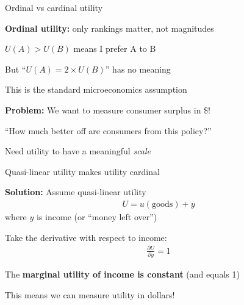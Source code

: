\documentclass[notes,11pt, aspectratio=169]{beamer}
\newenvironment{wideitemize}{\itemize\addtolength{\itemsep}{10pt}}{\enditemize}
\begin{document}
\begin{frame}{Ordinal vs cardinal utility}
	\begin{wideitemize}
		\item \textbf{Ordinal utility:} only rankings matter, not magnitudes
		\begin{wideitemize}
			\vspace{5pt}
			\item $U(A) > U(B)$ means I prefer A to B
			\item But ``$U(A) = 2 \times U(B)$'' has no meaning
		\end{wideitemize}
		\item This is the standard microeconomics assumption
		\item \textbf{Problem:} We want to measure consumer surplus in \$!
		\begin{wideitemize}
			\vspace{5pt}
			\item ``How much better off are consumers from this policy?''
			\item Need utility to have a meaningful \textit{scale}
		\end{wideitemize}
	\end{wideitemize}
\end{frame}

\begin{frame}{Quasi-linear utility makes utility cardinal}
	\begin{wideitemize}
		\item \textbf{Solution:} Assume quasi-linear utility
		\begin{align*}
			U = u(\text{goods}) + y
		\end{align*}
		where $y$ is income (or ``money left over'')
		\item Take the derivative with respect to income:
		\begin{align*}
			\frac{\partial U}{\partial y} = 1
		\end{align*}
		\item The \textbf{marginal utility of income is constant} (and equals 1)
		\item This means we can measure utility in dollars!
	\end{wideitemize}
\end{frame}
\end{document}
